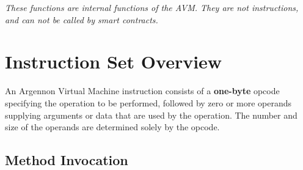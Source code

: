\documentclass[11pt, a4paper]{report}
\newcommand{\note}[1] {
    \begin{tcolorbox}[colframe=white,colback=white]
        \emph{#1}
    \end{tcolorbox}
}
\begin{document}
    \note{These functions are internal functions of the AVM. They are not instructions, and can not be called by smart
    contracts.}

    \section{Instruction Set Overview}\label{sec:instruction-set-overview}

    An Argennon Virtual Machine instruction consists of a \textbf{one-byte} opcode specifying the operation to be
    performed, followed by zero or more operands supplying arguments or data that are used by the operation.
    The number and size of the operands are determined solely by the opcode.

    \subsection{Method Invocation}\label{subsec:method-invocation}
\end{document}

